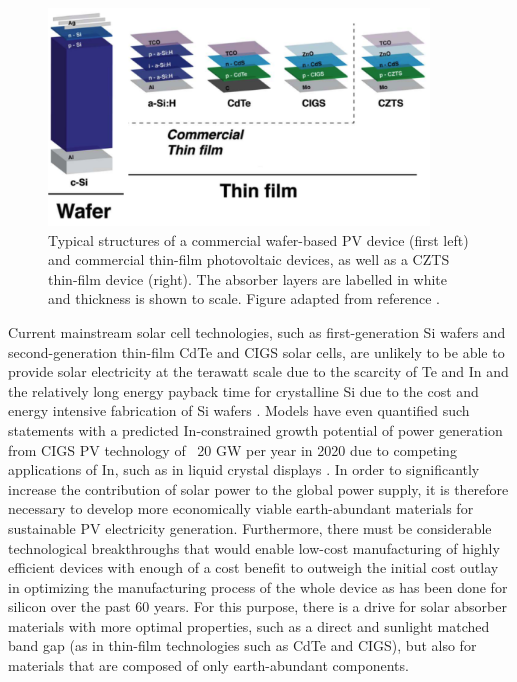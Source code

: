 \begin{figure}[h!]
  \centering
    \includegraphics[width=0.9\textwidth]{figures/thin_films2.png}
    \caption{Typical structures of a commercial wafer-based PV device (first left) and commercial thin-film photovoltaic devices, as well as a CZTS thin-film device (right). The absorber layers are labelled in white and thickness is shown to scale. Figure adapted from reference .}
  \label{thin_films}
\end{figure}

Current mainstream solar cell technologies, such as first-generation Si wafers and second-generation thin-film CdTe and CIGS solar cells, are unlikely to be able to provide solar electricity at the terawatt scale due to the scarcity of Te and In and the relatively long energy payback time for crystalline Si due to the cost and energy intensive fabrication of Si wafers \cite{CZTS_vs_MAPI}. 
Models have even quantified such statements with a predicted In-constrained growth potential of power generation from CIGS PV technology of ~20 GW per year in 2020 due to competing applications of In, such as in liquid crystal displays \cite{culprit_5_3}.
In order to significantly increase the contribution of solar power to the global power supply, it is therefore necessary to develop more economically viable earth-abundant materials for sustainable PV electricity generation. Furthermore, there must be considerable technological breakthroughs that would enable low-cost manufacturing of highly efficient devices with enough of a cost benefit to outweigh the initial cost outlay in optimizing the manufacturing process of the whole device as has been done for silicon over the past 60 years. For this purpose, there is a drive for solar absorber materials with more optimal properties, such as a direct and sunlight matched band gap (as in thin-film technologies such as CdTe and CIGS), but also for materials that are composed of only earth-abundant components. 


